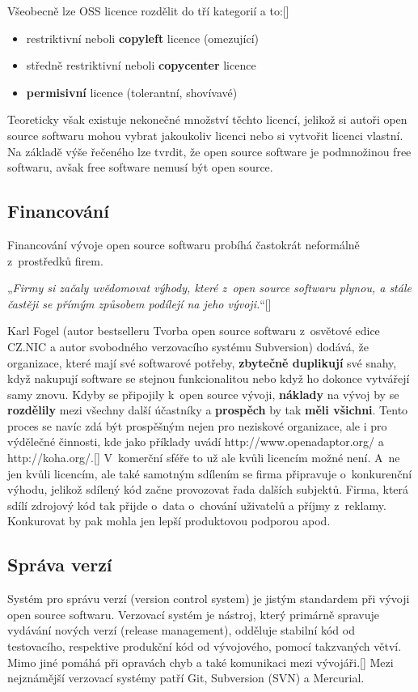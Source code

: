 \documentclass[
	11pt, oneside, printed, draft, 
	table,   %
	lof,     %
	lot     %
]{fithesis3}
\makeatletter
\newcommand{\citepages}[2]{[\cite[#1]{#2}]}
\newcommand{\bold}[1]{\textbf{#1}}
\newcommand{\citace}[1]{„\textit{#1}“} %
\newcommand{\mezera}{\bigskip}
\makeatother
\begin{document}
{Všeobecně lze OSS licence rozdělit do tří kategorií a to:\citepages{9-10}{6226510}
\begin{itemize}
\item restriktivní neboli \bold{copyleft} licence (omezující)
\item středně restriktivní neboli \bold{copycenter} licence
\item \bold{permisivní} licence (tolerantní, shovívavé)
\end{itemize}
Teoreticky však existuje nekonečné množství těchto licencí, jelikož si autoři open source softwaru mohou vybrat jakoukoliv licenci nebo si vytvořit licenci vlastní.
Na základě výše řečeného lze tvrdit, že open source software je podmnožinou free softwaru, avšak free software nemusí být open source.

\subsection{Financování}
Financování vývoje open source softwaru probíhá častokrát neformálně z~prostředků firem.

\mezera 
\citace{Firmy si začaly uvědomovat výhody, které z~open source softwaru plynou, a stále častěji se přímým způsobem podílejí na jeho vývoji.}\citepages{129}{Fogel2012}
\mezera

Karl Fogel (autor bestselleru Tvorba open source softwaru z~osvětové edice CZ.NIC a autor svobodného verzovacího systému Subversion) dodává, že organizace, které mají své softwarové potřeby, \bold{zbytečně duplikují} své snahy, když nakupují software se stejnou funkcionalitou nebo když ho dokonce vytvářejí samy znovu. Kdyby se připojily k~open source vývoji, \bold{náklady} na vývoj by se \bold{rozdělily} mezi všechny další účastníky a \bold{prospěch} by tak \bold{měli všichni}. Tento proces se navíc zdá být prospěšným nejen pro neziskové organizace, ale i pro výdělečné činnosti, kde jako příklady uvádí http://www.openadaptor.org/ a http://koha.org/.\citepages{130-132}{Fogel2012} V~komerční sféře to už ale kvůli licencím možné není. A~ne jen kvůli licencím, ale také samotným sdílením se firma připravuje o~konkurenční výhodu, jelikož sdílený kód začne provozovat řada dalších subjektů. Firma, která sdílí zdrojový kód tak přijde o~data o~chování uživatelů a příjmy z~reklamy. Konkurovat by pak mohla jen lepší produktovou podporou apod. 

\subsection{Správa verzí}
Systém pro správu verzí (version control system) je jistým standardem při vývoji open source softwaru. Verzovací systém je nástroj, který primárně spravuje vydávání nových verzí (release management), odděluje stabilní kód od testovacího, respektive produkční kód od vývojového, pomocí takzvaných větví. Mimo jiné pomáhá při opravách chyb a také komunikaci mezi vývojáři.\citepages{17-21, 59-64}{Chaconc2009} Mezi nejznámější verzovací systémy patří Git, Subversion (SVN) a Mercurial.

}
\end{document}
